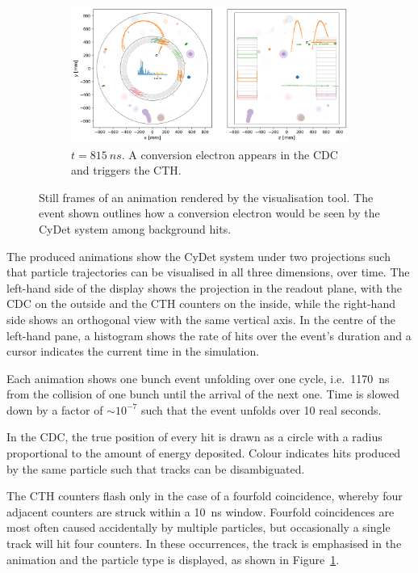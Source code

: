 \begin{figure}
    \begin{subfigure}[t]{0.59\textwidth}
    \centering
    \includegraphics[width=\textwidth]{chapter3/frame_192.png}
    \caption{$t=\SI{815}{ns}$. A conversion electron appears in the CDC and
    triggers the CTH.}
    \label{fig:animation:conv}
    \end{subfigure}
    
    \caption{ Still frames of an animation rendered by the visualisation tool.
        The event shown outlines how a conversion electron would be seen by the
        CyDet system among background hits.}
    \label{fig:animation}
\end{figure}


The produced animations show the CyDet system under two projections such that
particle trajectories can be visualised in all three dimensions, over time. The
left-hand side of the display shows the projection in the readout plane, with
the CDC on the outside and the CTH counters on the inside, while the right-hand
side shows an orthogonal view with the same vertical axis. In the centre of the
left-hand pane, a histogram shows the rate of hits over the event's duration and
a cursor indicates the current time in the simulation.

Each animation shows one bunch event unfolding over one cycle, i.e.\
\SI{1170}{\ns} from the collision of one bunch until the arrival of the next
one. Time is slowed down by a factor of ${\sim}10^{-7}$ such that the event
unfolds over 10 real seconds.

In the CDC, the true position of every hit is drawn as a circle with a radius
proportional to the amount of energy deposited. Colour indicates hits produced
by the same particle such that tracks can be disambiguated.

The CTH counters flash only in the case of a fourfold coincidence, whereby four
adjacent counters are struck within a \SI{10}{\ns} window. Fourfold coincidences
are most often caused accidentally by multiple particles, but occasionally a
single track will hit four counters. In these occurrences, the track is
emphasised in the animation and the particle type is displayed, as shown
in Figure~\ref{fig:animation:conv}.

